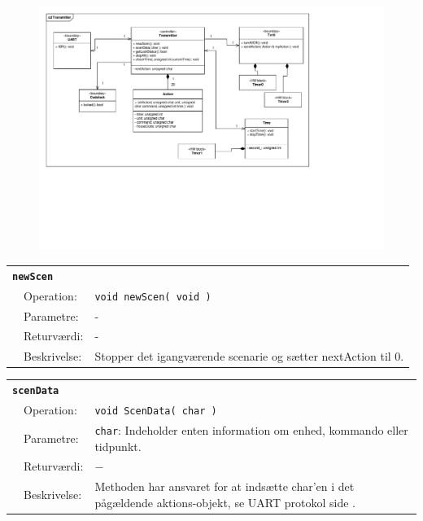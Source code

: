 \begin{figure}[h]
\centering
\includegraphics[scale=1,clip=true, trim=225 429 438 50]{Systemarkitektur/diagrammer/Transmitter_Klassediagram} %
\end{figure}

\begin{table}[h]
\begin{tabularx}{\textwidth}{p{0.6 cm} l X} %
\multicolumn{3}{l}{\textbf{\texttt{newScen}}}\\
& Operation: &
\texttt{void newScen( void )}
\\ & Parametre: & %
-
\\ & Returværdi: & %
-
\\ & Beskrivelse: & %
Stopper det igangværende scenarie og sætter nextAction til 0.
\\ \end{tabularx}
\end{table}

\begin{table}[h]
\begin{tabularx}{\textwidth}{p{0.6 cm} l X} %
\multicolumn{3}{l}{\textbf{\texttt{scenData}}}\\
& Operation: &
\texttt{void ScenData( char )}
\\ & Parametre: & %
\texttt{char}: Indeholder enten information om enhed, kommando eller tidpunkt.
\\ & Returværdi: & %
$-$
\\ & Beskrivelse: & %
Methoden har ansvaret for at indsætte char'en i det pågældende aktions-objekt, se UART protokol side \pageref{prot_UART}.
\\ \end{tabularx}
\end{table}

